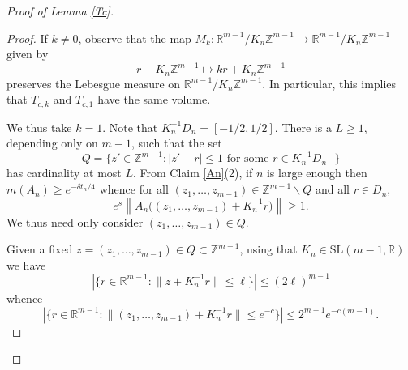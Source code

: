 \documentclass[10pt,reqno]{amsart}
\theoremstyle{Theorem}
\theoremstyle{definition}
\theoremstyle{remark}
\newcommand{\noted}[1]{\marginpar{{\color{blue}\footnotesize \begin{spacing}{1}#1\end{spacing}}}}
\newcommand{\sm}{\smallsetminus}
\newcommand{\R}{\mathbb {R}}
\newcommand{\Z}{\mathbb {Z}}
\newcommand{\Xt}{X_{\mathrm{thick}}}
\newcommand{\Sl}{\mathrm{SL}}
\newcommand{\inv}{^{-1}}
\def\red{\color{red}}
\def\blue{}
\begin{document}
\begin{proof}[Proof of Lemma \ref{Tc}]
\begin{proof}
If $k \neq 0$,
observe that the map $M_k\colon \R^{m-1}/K_n \Z^{m-1} \to \R^{m-1}/K_n\Z^{m-1}$ given by $$r+ K_n \Z^{m-1}\mapsto kr+ K_n \Z^{m-1}$$ preserves the Lebesgue measure on $\R^{m-1}/K_n \Z^{m-1}.$  In particular, this implies that $T_{c,k}$ and $T_{c,1}$ have the same volume.

{\blue
We thus take $k = 1$.
Note that $K_n\inv D_n=[-1/2,1/2]$.   There is a $L\ge 1$, depending only on $m-1$, such that   the set
	$$Q=\{z'\in \Z^{m-1} :  |z'+r|\le 1 \text{ for some $r\in K_n\inv D_n$ }\}$$
	has cardinality at most $L$.    From Claim \ref{An}(2),  if $n$ is large enough then  $m(A_n)\ge e^{-\delta t_n/4}$ whence for all $ (z_1, \dots, z_{m-1}) \in \Z^{m-1} \sm Q$ and all $r\in D_n$,
	$$e^s\left\| A_n \Big(
 (z_1, \dots, z_{m-1}) + K_n\inv   r\Big)
\right\|  \ge 1.$$
We thus need only consider $(z_1, \dots, z_{m-1})\in Q$.
}



Given a fixed $z= (z_1, \dots,  z_{m-1})\in Q\subset  \Z^{m-1}$, using that $K_n\in \Sl(m-1, \R)$
we have $$\left | \{r\in \R^{m-1}  : \|z+K_n\inv  r\|\le \ell \} \right|\le (2\ell )^{m-1}$$
whence $$\left |\{ r\in \R^{m-1}  :  \|(z_1, \dots, z_{m-1}) + K_n\inv   r \| \le e^{-c}  \} \right| \le 2^{m-1} e^{-c(m-1)}.$$




\end{proof}
\end{proof}
\end{document}

